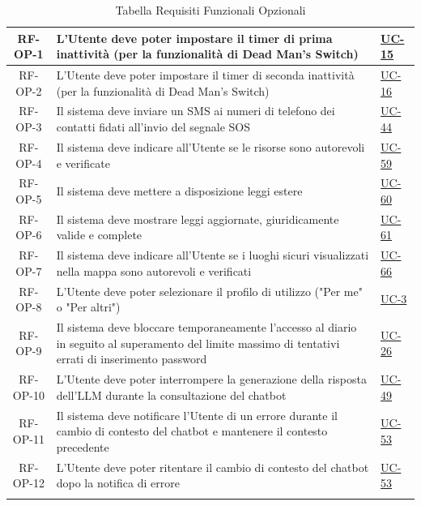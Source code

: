 \documentclass[a4paper,12pt]{article}
\begin{document}
\begin{center}
\begin{longtable}{|c|p{8.5cm}|>{\centering\arraybackslash}p{4cm}|}
\rowcolor{gray!20}
RF-OP-1 & L'Utente deve poter impostare il timer di prima inattività (per la funzionalità di Dead Man's Switch) & \hyperref[sec:UC-15]{UC-15} \\
\hline
\rowcolor{white}
RF-OP-2 & L'Utente deve poter impostare il timer di seconda inattività (per la funzionalità di Dead Man's Switch) & \hyperref[sec:UC-16]{UC-16} \\
\hline
\rowcolor{gray!20}
RF-OP-3 & Il sistema deve inviare un SMS ai numeri di telefono dei contatti fidati all'invio del segnale SOS & \hyperref[sec:UC-44]{UC-44} \\
\hline
\rowcolor{white}
RF-OP-4 & Il sistema deve indicare all'Utente se le risorse sono autorevoli e verificate & \hyperref[sec:UC-59]{UC-59} \\
\hline
\rowcolor{gray!20}
RF-OP-5 & Il sistema deve mettere a disposizione leggi estere & \hyperref[sec:UC-60]{UC-60} \\
\hline
\rowcolor{white}
RF-OP-6 & Il sistema deve mostrare leggi aggiornate, giuridicamente valide e complete & \hyperref[sec:UC-61]{UC-61} \\
\hline
\rowcolor{gray!20}
RF-OP-7 & Il sistema deve indicare all'Utente se i luoghi sicuri visualizzati nella mappa sono autorevoli e verificati & \hyperref[sec:UC-66]{UC-66} \\
\hline
\rowcolor{white}
RF-OP-8 & L'Utente deve poter selezionare il profilo di utilizzo ("Per me" o "Per altri") & \hyperref[subsec:UC-3]{UC-3} \\
\hline
\rowcolor{gray!20}
RF-OP-9 & Il sistema deve bloccare temporaneamente l'accesso al diario in seguito al superamento del limite massimo di tentativi errati di inserimento password & \hyperref[subsec:UC-26]{UC-26} \\
\hline
\rowcolor{white}
RF-OP-10 & L'Utente deve poter interrompere la generazione della risposta dell'LLM durante la consultazione del chatbot & \hyperref[sec:UC-49]{UC-49} \\
\hline
\rowcolor{gray!20}
RF-OP-11 & Il sistema deve notificare l'Utente di un errore durante il cambio di contesto del chatbot e mantenere il contesto precedente & \hyperref[sec:UC-53]{UC-53} \\
\hline
\rowcolor{white}
RF-OP-12 & L'Utente deve poter ritentare il cambio di contesto del chatbot dopo la notifica di errore & \hyperref[sec:UC-53]{UC-53} \\
\hline

\caption{Tabella Requisiti Funzionali Opzionali} \label{tab:requisiti_funzionali_opzionali} \\
\end{longtable}
\end{center}
\end{document}
